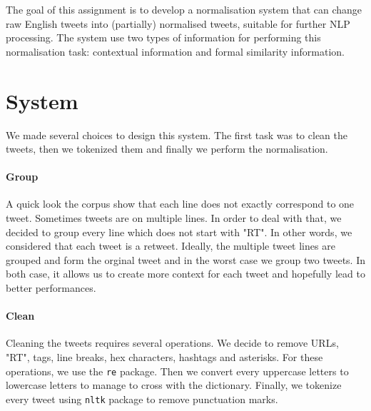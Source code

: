 \documentclass[11pt]{article}
\begin{document}
\maketitle 

The goal of this assignment is to develop a normalisation system that can change raw English tweets into (partially) normalised tweets, suitable for further NLP processing. The system use two types of information for performing this normalisation task: contextual information and formal similarity information.

\section{System}
  We made several choices to design this system. The first task was to clean the tweets, then we tokenized them and finally we perform the normalisation. 

  \paragraph{Group} %
  \label{par:group}
  A quick look the corpus show that each line does not exactly correspond to one tweet. Sometimes tweets are on multiple lines. In order to deal with that, we decided to group every line which does not start with "RT". In other words, we considered that each tweet is a retweet. Ideally, the multiple tweet lines are grouped and form the orginal tweet and in the worst case we group two tweets. In both case, it allows us to create more context for each tweet and hopefully lead to better performances.

  \paragraph{Clean} %
  \label{sub:clean}
    Cleaning the tweets requires several operations. We decide to remove URLs, "RT", tags, line breaks, hex characters, hashtags and asterisks. For these operations, we use the \texttt{re} package. Then we convert every uppercase letters to lowercase letters to manage to cross with the dictionary. Finally, we tokenize every tweet using \texttt{nltk} package to remove punctuation marks.
\end{document}
